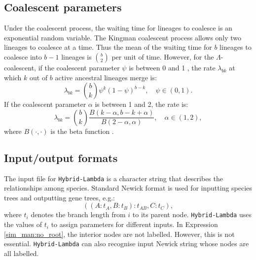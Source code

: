\subsection{Coalescent parameters}
Under the coalescent process, the waiting time for lineages to coalesce is an exponential random variable. The Kingman coalescent process allows only two lineages to coalesce at a time. Thus the mean of the waiting time for $b$ lineages to coalesce into $b-1$ lineages is $\binom{b}{2}$ per unit of time. However, for the $\Lambda$-coalescent, if the coalescent parameter $\psi$ is between 0 and 1 \citep{Eldon2006}, the rate $\lambda_{bk}$
at which $k$ out of $b$ active ancestral lineages merge is:
\begin{equation}
\label{sim_man:eqn:psi}
\lambda_{bk}=\binom{b}{k}\psi^k(1-\psi)^{b-k},\quad \psi \in (0,1).
\end{equation}
If the coalescent parameter $\alpha$ is between 1
and 2, the rate is:
\begin{equation}
\label{sim_man:eqn:alpha}
\lambda_{bk}=\binom{b}{k}\frac{B(k-\alpha,b-k+\alpha)}{B(2-\alpha,\alpha)}, \quad \alpha \in (1,2),
\end{equation}
where $B(\cdot,\cdot)$  is the beta function \citep{Schweinsberg2003}.

\subsection{Input/output formats}\label{sim_man:input}
The input file for {\tt Hybrid-Lambda} is a character string that describes the relationships among species. Standard Newick format \citep{Olsen1990} is used for inputting species trees and outputting
gene trees, e.g.:
\begin{equation}
((A:t_A,B:t_B):t_{AB},C:t_C)\label{sim_man:no_root},
\end{equation}
where $t_i$ denotes the branch length from $i$ to its parent node. {\tt Hybrid-Lambda} uses the values of $t_i$ to assign parameters for different inputs. In Expression \eqref{sim_man:no_root}, the interior nodes are not labelled. However, this is not essential. {\tt Hybrid-Lambda} can also recognise input Newick string whose nodes are all labelled.

